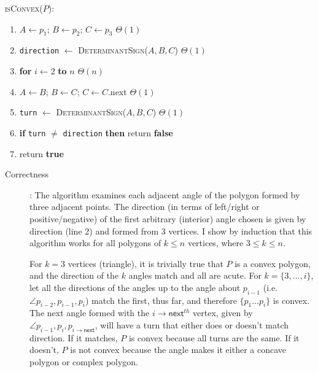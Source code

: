 \documentclass [12pt]{article}
\begin{document}
\begin{enumerate}[label=(\alph*)]
            \textsc{isConvex($P$)}:
            \cbstart
            \begin{enumerate}[label=\arabic*.]
                \item $A \leftarrow p_1$; $B \leftarrow p_2$; $C \leftarrow p_3$ \hspace{1cm} $\Theta(1)$
                \item \texttt{direction} $\leftarrow$ \textsc{DeterminantSign}($A, B, C$) \hspace{1cm} $\Theta(1)$
                \item \textbf{for} $i \leftarrow 2$ \textbf{to} $n$ \hspace{1cm} $\Theta(n)$
                \item \hspace{1cm} $A \leftarrow B$; $B \leftarrow C$; $C \leftarrow C$.\textsf{next} \hspace{1cm} $\Theta(1)$
                \item \hspace{1cm} \texttt{turn} $\leftarrow$ \textsc{DeterminantSign}($A, B, C$) \hspace{1cm} $\Theta(1)$
                \item \hspace{1cm} \textbf{if} \texttt{turn} $\neq$ \texttt{direction} \textbf{then} return \textbf{false}
                \item return \textbf{true}
            \end{enumerate}
            \cbend

            \begin{description}
                \item[Correctness]: The algorithm examines each adjacent angle of the polygon formed by three adjacent points. The direction (in terms of left/right or positive/negative) of the first arbitrary (interior) angle chosen is given by \textsf{direction} (line 2) and formed from 3 vertices. I show by induction that this algorithm works for all polygons of $k \leq n$ vertices, where $3 \leq k \leq n$.
                
                For $k = 3$ vertices (triangle), it is trivially true that $P$ is a convex polygon, and the  direction of the $k$ angles match and all are acute. For $k = \{3, ..., i\}$, let all the directions of the angles up to the angle about $p_{i-1}$ (i.e. $\angle p_{i-2}, p_{i-1}, p_i$) match the first, thus far, and therefore $\{p_1 ... p_i\}$ is convex. The next angle formed with the $i\rightarrow\textsf{next}^{th}$ vertex, given by $\angle p_{i-1}, p_{i}, p_{i\rightarrow\textsf{next}}$, will have a \textsf{turn} that either does or doesn't match \textsf{direction}. If it matches, $P$ is convex because all turns are the same. If it doesn't, $P$ is not convex because the angle makes it either a concave polygon or complex polygon.
                


\end{description}
\end{enumerate}
\end{document}
